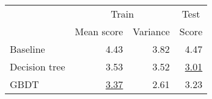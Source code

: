 \begin{tabular}{lrrr}
  \toprule
                & \multicolumn{2}{c}{Train} & \multicolumn{1}{c}{Test}
  \\
  \cmidrule(lr){2-4}

                & Mean score                & Variance                 & Score
  \\
  \midrule
  Baseline      & 4.43                      & 3.82                     & 4.47
  \\
  Decision tree & 3.53                      & 3.52                     & \underline{3.01}
  \\
  GBDT          & \underline{3.37}          & 2.61                     & 3.23
  \\
  \bottomrule
\end{tabular}
